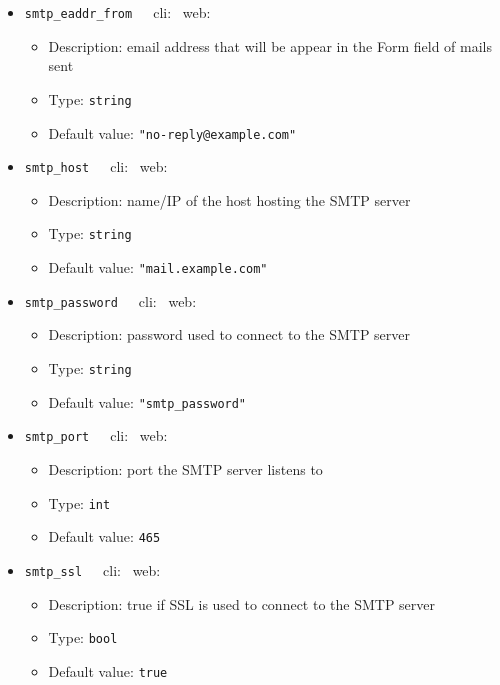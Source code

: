 {\begin{itemize}[itemsep=0pt,parsep=0pt,topsep=0pt,partopsep=0pt]
\begin{itemize}[itemsep=0pt,parsep=0pt,topsep=0pt,partopsep=0pt]
  \item Default value:  {\tt{true}}
  \end{itemize}
\item{\tt{smtp\_eaddr\_from}}~~~cli: \xmark~web: \cmark
  \begin{itemize}[itemsep=0pt,parsep=0pt,topsep=0pt,partopsep=0pt]
  \item Description:  email address that will be appear in the Form field of mails sent
  \item Type:  {\tt{string}}
  \item Default value:  {\tt{"no-reply@example.com"}}
  \end{itemize}
\item{\tt{smtp\_host}}~~~cli: \xmark~web: \cmark
  \begin{itemize}[itemsep=0pt,parsep=0pt,topsep=0pt,partopsep=0pt]
  \item Description:  name/IP of the host hosting the SMTP server
  \item Type:  {\tt{string}}
  \item Default value:  {\tt{"mail.example.com"}}
  \end{itemize}
\item{\tt{smtp\_password}}~~~cli: \xmark~web: \cmark
  \begin{itemize}[itemsep=0pt,parsep=0pt,topsep=0pt,partopsep=0pt]
  \item Description:  password used to connect to the SMTP server
  \item Type:  {\tt{string}}
  \item Default value:  {\tt{"smtp\_password"}}
  \end{itemize}
\item{\tt{smtp\_port}}~~~cli: \xmark~web: \cmark
  \begin{itemize}[itemsep=0pt,parsep=0pt,topsep=0pt,partopsep=0pt]
  \item Description:  port the SMTP server listens to
  \item Type:  {\tt{int}}
  \item Default value:  {\tt{465}}
  \end{itemize}
\item{\tt{smtp\_ssl}}~~~cli: \xmark~web: \cmark
  \begin{itemize}[itemsep=0pt,parsep=0pt,topsep=0pt,partopsep=0pt]
  \item Description:  true if SSL is used to connect to the SMTP server
  \item Type:  {\tt{bool}}
  \item Default value:  {\tt{true}}

\end{itemize}
\end{itemize}}
